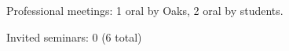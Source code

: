\begin{tightItemize}
    \item Professional meetings: 1 oral by Oaks, 2 oral by students.
    \item Invited seminars: 0 (6 total)
\end{tightItemize}
